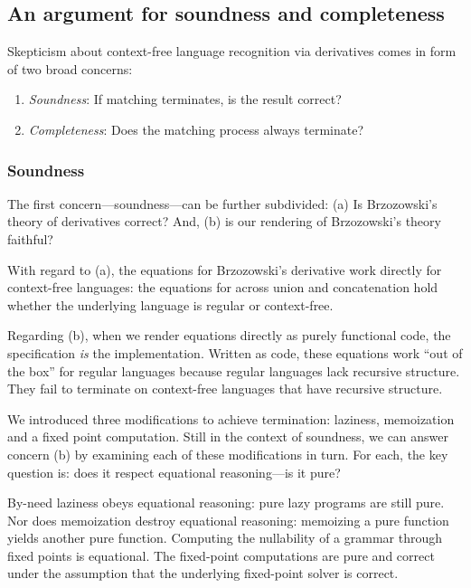 \subsection{An argument for soundness and completeness}
%
Skepticism about context-free language
recognition via derivatives 
comes in form of two broad concerns:
\begin{enumerate}

\item \emph{Soundness}: If matching terminates, is the result correct?

\item \emph{Completeness}: Does the matching process always terminate?

\end{enumerate}


\subsubsection{Soundness}

The first concern---soundness---can be further subdivided: (a) Is Brzozowski's
theory of derivatives correct? And, (b) is our rendering of Brzozowski's theory
faithful?

With regard to (a), the equations for Brzozowski's derivative work
directly for context-free languages:
%
the equations for across union and concatenation hold whether the underlying
language is regular or context-free.



Regarding (b), when we render equations directly as purely functional code,
the specification \emph{is} the implementation.
%
Written as code, these equations work ``out of the box'' for regular languages
because regular languages lack recursive structure.
%
They fail to terminate on context-free languages that have recursive structure.


We introduced three modifications to achieve termination: laziness, memoization
and a fixed point computation.
%
Still in the context of soundness, we can answer concern (b) by examining each
of these modifications in turn.
%
For each, the key question is: does it respect equational reasoning---is it
pure?

By-need laziness obeys equational reasoning: pure lazy programs are still pure.
%
Nor does memoization destroy equational reasoning: memoizing a pure function
yields another pure function.
%
Computing the nullability of a grammar through fixed points is equational.
%
The fixed-point computations are pure and correct under the assumption that the
underlying fixed-point solver is correct.

